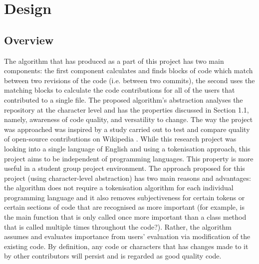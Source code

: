\chapter{Design}

\section{Overview}
The algorithm that has produced as a part of this project has two main components: the first component calculates and finds blocks of code which match between two revisions of the code (i.e. between two commits), the second uses the matching blocks to calculate the code contributions for all of the users that contributed to a single file. The proposed algorithm's abstraction analyses the repository at the character level and has the properties discussed in Section 1.1, namely, awareness of code quality, and versatility to change. The way the project was approached was inspired by a study carried out to test and compare quality of open-source contributions on Wikipedia \citep{10.1145/1531674.1531682}. While this research project was looking into a single language of English and using a tokenisation approach, this project aims to be independent of programming languages. This property is more useful in a student group project environment. The approach proposed for this project (using character-level abstraction) has two main reasons and advantages: the algorithm does not require a tokenisation algorithm for each individual programming language and it also removes subjectiveness for certain tokens or certain sections of code that are recognised as more important (for example, is the main function that is only called once more important than a class method that is called multiple times throughout the code?). Rather, the algorithm assumes and evaluates importance from users' evaluation via modification of the existing code. By definition, any code or characters that has changes made to it by other contributors will persist and is regarded as good quality code.

